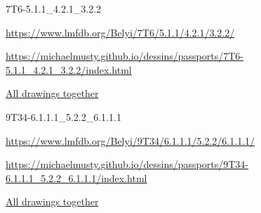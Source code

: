 \documentclass{beamer}
\begin{document}
\begin{frame}[plain]{7T6-5.1.1\_4.2.1\_3.2.2}
    \begin{vfilleditems}
        \item \url{https://www.lmfdb.org/Belyi/7T6/5.1.1/4.2.1/3.2.2/}
        \item \url{https://michaelmusty.github.io/dessins/passports/7T6-5.1.1_4.2.1_3.2.2/index.html}
        \item \href{https://www.figma.com/board/tiY2q2WUYoc5aYhXpHszZl/dessins?node-id=0-1&t=sNgwVi3bdSOrXl78-1}{All drawings together}
    \end{vfilleditems}
\end{frame}
\begin{frame}[plain]{9T34-6.1.1.1\_5.2.2\_6.1.1.1}
    \begin{vfilleditems}
        \item \url{https://www.lmfdb.org/Belyi/9T34/6.1.1.1/5.2.2/6.1.1.1/}
        \item \url{https://michaelmusty.github.io/dessins/passports/9T34-6.1.1.1_5.2.2_6.1.1.1/index.html}
        \item \href{https://www.figma.com/board/DqosFmGPM6TZ6JRC0GqKrv/9T34-6.1.1.1_5.2.2_6.1.1.1?node-id=0-1&t=oSOOBi353di5uS75-1}{All drawings together}
    \end{vfilleditems}
\end{frame}
\end{document}
